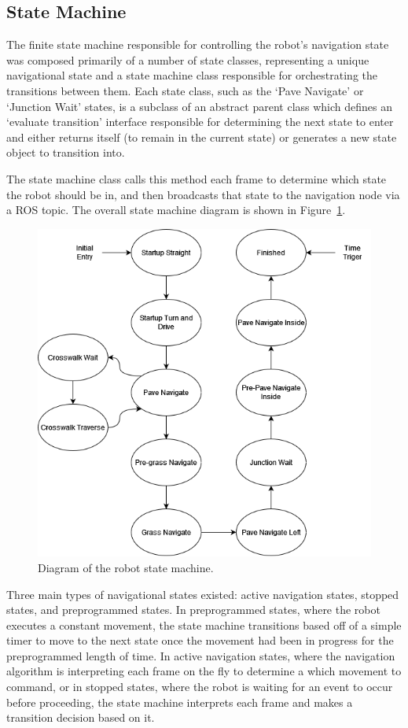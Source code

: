 \documentclass[titlepage, twocolumn]{article}
\begin{document}
    \subsection{State Machine}
        The finite state machine responsible for controlling the robot's navigation state was composed primarily of a number of state classes, representing a unique navigational state and a state machine class responsible for orchestrating the transitions between them. Each state class, such as the `Pave Navigate' or `Junction Wait' states, is a subclass of an abstract parent class which defines an `evaluate transition' interface responsible for determining the next state to enter and either returns itself (to remain in the current state) or generates a new state object to transition into. 
        
        The state machine class calls this method each frame to determine which state the robot should be in, and then broadcasts that state to the navigation node via a ROS topic. The overall state machine diagram is shown in Figure~\ref{fig:statemachine}.

        \begin{figure}
            \centering
            \includegraphics[width=0.8\linewidth]{statemachine.png}
            \caption{Diagram of the robot state machine.}
            \label{fig:statemachine}
        \end{figure}

        Three main types of navigational states existed: active navigation states, stopped states, and preprogrammed states. In preprogrammed states, where the robot executes a constant movement, the state machine transitions based off of a simple timer to move to the next state once the movement had been in progress for the preprogrammed length of time. In active navigation states, where the navigation algorithm is interpreting each frame on the fly to determine a which movement to command, or in stopped states, where the robot is waiting for an event to occur before proceeding, the state machine interprets each frame and makes a transition decision based on it.
\end{document}
